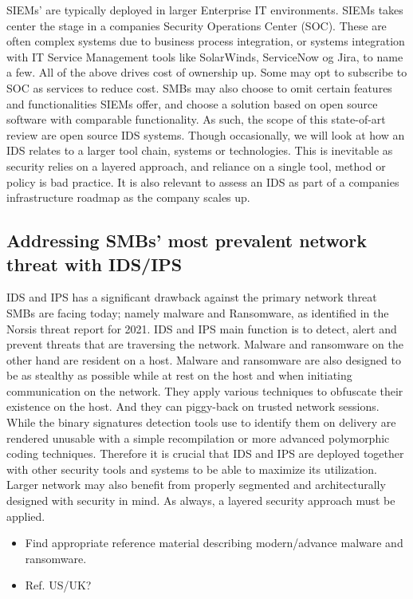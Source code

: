 SIEMs' are typically deployed in larger Enterprise IT environments. SIEMs takes center the stage in a companies Security Operations Center (SOC). These are often complex systems due to business process integration, or systems integration with IT Service Management tools like SolarWinds, ServiceNow og Jira, to name a few. All of the above drives cost of ownership up. Some may opt to subscribe to SOC as services to reduce cost. SMBs may also choose to omit certain features and functionalities SIEMs offer, and choose a solution based on open source software with comparable functionality. As such, the scope of this state-of-art review are open source IDS systems. Though occasionally, we will look at how an IDS relates to a larger tool chain, systems or technologies. This is inevitable as security relies on a layered approach, and reliance on a single tool, method or policy is bad practice. It is also relevant to assess an IDS as part of a companies infrastructure roadmap as the company scales up.

\subsection{Addressing SMBs' most prevalent network threat with IDS/IPS}

IDS and IPS has a significant drawback against the primary network threat SMBs are facing today; namely malware and Ransomware, as identified in the Norsis \cite{Norsis2021} threat report for 2021. IDS and IPS main function is to detect, alert and prevent threats that are traversing the network. Malware and ransomware on the other hand are resident on a host. Malware and ransomware are also designed to be as stealthy as possible while at rest on the host and when initiating communication on the network. They apply various techniques to obfuscate their existence on the host. And they can piggy-back on trusted network sessions. While the binary signatures detection tools use to identify them on delivery are rendered unusable with a simple recompilation or more advanced polymorphic coding techniques. Therefore it is crucial that IDS and IPS are deployed together with other security tools and systems to be able to maximize its utilization. Larger network may also benefit from properly segmented and architecturally designed with security in mind. As always, a layered security approach must be applied.

\begin{followup}[to-do]
    \begin{itemize}
        \item Find appropriate reference material describing modern/advance malware and ransomware.
        \item Ref. US/UK?
    \end{itemize}
    
\end{followup}